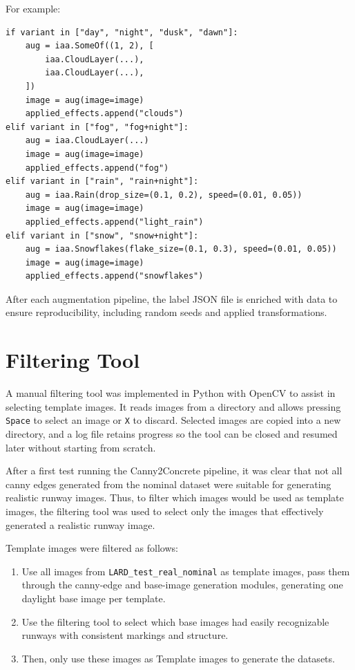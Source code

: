 For example:

\begin{lstlisting}
if variant in ["day", "night", "dusk", "dawn"]:
    aug = iaa.SomeOf((1, 2), [
        iaa.CloudLayer(...),
        iaa.CloudLayer(...),
    ])
    image = aug(image=image)
    applied_effects.append("clouds")
elif variant in ["fog", "fog+night"]:
    aug = iaa.CloudLayer(...)
    image = aug(image=image)
    applied_effects.append("fog")
elif variant in ["rain", "rain+night"]:
    aug = iaa.Rain(drop_size=(0.1, 0.2), speed=(0.01, 0.05))
    image = aug(image=image)
    applied_effects.append("light_rain")
elif variant in ["snow", "snow+night"]:
    aug = iaa.Snowflakes(flake_size=(0.1, 0.3), speed=(0.01, 0.05))
    image = aug(image=image)
    applied_effects.append("snowflakes")
\end{lstlisting}

After each augmentation pipeline, the label JSON file is enriched with data to ensure reproducibility, including random seeds and applied transformations.

\section{Filtering Tool}

A manual filtering tool was implemented in Python with OpenCV to assist in selecting template images. 
It reads images from a directory and allows pressing \texttt{Space} to select an image or \texttt{X} to discard. 
Selected images are copied into a new directory, and a log file retains progress so the tool can be closed and resumed later without starting from scratch.

After a first test running the Canny2Concrete pipeline, it was clear that not
all canny edges generated from the nominal dataset were suitable for generating
realistic runway images. Thus, to filter which images would be used as template
images, the filtering tool was used to select only the images that effectively
generated a realistic runway image.

Template images were filtered as follows:
\begin{enumerate}
\item Use all images from \texttt{LARD\_test\_real\_nominal} as template images, pass them through the canny-edge and base-image generation modules, generating one daylight base image per template.
\item Use the filtering tool to select which base images had easily recognizable runways with consistent markings and structure.
\item Then, only use these images as Template images to generate the datasets.
\end{enumerate}

